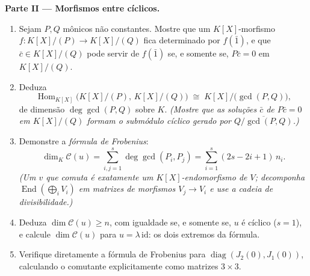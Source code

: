 \begin{problem}
\medskip
\noindent\textbf{Parte II --- Morfismos entre  cíclicos.}
\begin{enumerate}[resume]
  \item Sejam $P, Q$ mônicos não constantes. Mostre que um
        $K[X]$-morfismo $f \colon K[X]/(P) \to K[X]/(Q)$ fica determinado por $f(\bar 1)$, e que
        $\bar c \in K[X]/(Q)$ pode servir de $f(\bar 1)$ se, e somente se, $P\bar c = 0$ em $K[X]/(Q)$.
  \item Deduza
        \[
        \operatorname{Hom}_{K[X]}\bigl(K[X]/(P),\, K[X]/(Q)\bigr)
        \;\cong\; K[X]\big/\bigl(\gcd(P, Q)\bigr),
        \]
        de dimensão $\deg \gcd(P, Q)$ sobre $K$. \emph{(Mostre que as soluções
        $\bar c$ de $P\bar c = 0$ em $K[X]/(Q)$ formam o submódulo cíclico gerado
        por $\overline{Q/\gcd(P,Q)}$.)}
  \item Demonstre a \emph{fórmula de Frobenius}:
        \[
        \dim_K \mathcal C(u) = \sum_{i,j=1}^{s} \deg\gcd(P_i,
        P_j) = \sum_{i=1}^{s} (2s - 2i + 1)\, n_i .
        \]
        \emph{(Um $v$ que comuta é exatamente um
        $K[X]$-endomorfismo de $V$; decomponha $\operatorname{End}(\bigoplus_i V_i)$ em
        matrizes de morfismos $V_j \to V_i$ e use a cadeia de
        divisibilidade.)}
  \item Deduza $\dim \mathcal C(u) \geq n$, com igualdade se, e somente se, $u$ é cíclico
        ($s = 1$), e calcule $\dim\mathcal C(u)$ para $u = \lambda\,\mathrm{id}$: os dois extremos da
        fórmula.
  \item Verifique diretamente a fórmula de Frobenius para $\operatorname{diag}(J_2(0), J_1(0))$,
        calculando o comutante explicitamente como matrizes $3\times3$.
\end{enumerate}


\end{problem}
